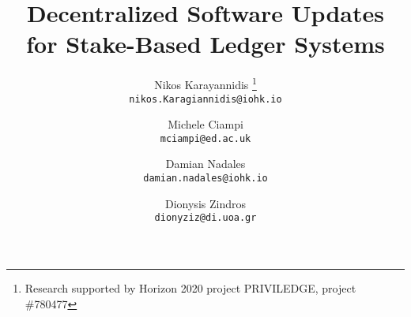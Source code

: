 \title{Decentralized Software Updates\\for Stake-Based Ledger Systems}

\author{
  Nikos Karayannidis  \fnmsep \thanks{Research supported by Horizon 2020 
  project PRIVILEDGE, 
  	project 
  	\#780477} \\
	{\small \texttt{nikos.Karagiannidis@iohk.io}} \\
	\and
  Michele Ciampi \\
	{\small \texttt{mciampi@ed.ac.uk}}\\
	\and
  Damian Nadales \\
	{\small \texttt{damian.nadales@iohk.io}} \\
	\and	
  Dionysis Zindros \\
 {\small \texttt{dionyziz@di.uoa.gr}}		
}

\let\oldaddcontentsline\addcontentsline
\def\addcontentsline#1#2#3{}
\maketitle
\def\addcontentsline#1#2#3{\oldaddcontentsline{#1}{#2}{#3}}